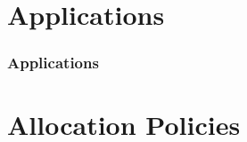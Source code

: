 \documentclass[10pt, pdf, xcolor=pdftex, dvipsnames, table]{beamer}
\begin{document}
\section[Applications]{Applications}

\begin{frame}
	\tableofcontents[currentsection]
\end{frame}

\begin{frame}
	\frametitle{Applications}
\end{frame}

\begin{frame}

\end{frame}

\begin{frame}

\end{frame}

\section[Allocation Policies]{Allocation Policies}

\begin{frame}
	\tableofcontents[currentsection]
\end{frame}

\begin{frame}
\end{frame}
\end{document}
